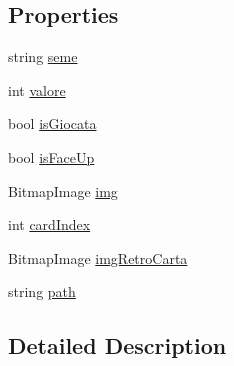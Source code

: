 \subsection*{Properties}
\begin{DoxyCompactItemize}
\item 
string \hyperlink{class_fontanella_1_1_simone_1_1__5i_1_1_briscola_1_1_card_a5b099fd5db757dd88b5d3b402d97e638}{seme}
\item 
int \hyperlink{class_fontanella_1_1_simone_1_1__5i_1_1_briscola_1_1_card_a0f375e6265e37cf5a126337790237ebe}{valore}
\item 
bool \hyperlink{class_fontanella_1_1_simone_1_1__5i_1_1_briscola_1_1_card_a367b0d4bca4b6b60caf8de05b452e1e9}{is\+Giocata}
\item 
bool \hyperlink{class_fontanella_1_1_simone_1_1__5i_1_1_briscola_1_1_card_a802c2936b18253d3341d82b9dd531f5a}{is\+Face\+Up}
\item 
Bitmap\+Image \hyperlink{class_fontanella_1_1_simone_1_1__5i_1_1_briscola_1_1_card_ae310d70e334b89c1feea95ca77d88633}{img}
\item 
int \hyperlink{class_fontanella_1_1_simone_1_1__5i_1_1_briscola_1_1_card_a171a027469d728688df3f9172e04a3a0}{card\+Index}
\item 
Bitmap\+Image \hyperlink{class_fontanella_1_1_simone_1_1__5i_1_1_briscola_1_1_card_a17dd300b4ba6f6eda18c73252bebb745}{img\+Retro\+Carta}
\item 
string \hyperlink{class_fontanella_1_1_simone_1_1__5i_1_1_briscola_1_1_card_a664e60aa4ec3d2cc6b22d67ca0649335}{path}
\end{DoxyCompactItemize}


\subsection{Detailed Description}


